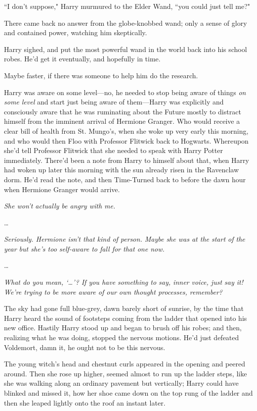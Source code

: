 ``I don't suppose," Harry murmured to the Elder Wand, ``you could just tell me?"

There came back no answer from the globe-knobbed wand; only a sense of glory and contained power, watching him skeptically.

Harry sighed, and put the most powerful wand in the world back into his school robes. He'd get it eventually, and hopefully in time.

Maybe faster, if there was someone to help him do the research.

Harry was aware on some level—no, he needed to stop being aware of things \emph{on some level} and start just being aware of them—Harry was explicitly and consciously aware that he was ruminating about the Future mostly to distract himself from the imminent arrival of Hermione Granger. Who would receive a clear bill of health from St. Mungo's, when she woke up very early this morning, and who would then Floo with Professor Flitwick back to Hogwarts. Whereupon she'd tell Professor Flitwick that she needed to speak with Harry Potter immediately. There'd been a note from Harry to himself about that, when Harry had woken up later this morning with the sun already risen in the Ravenclaw dorm. He'd read the note, and then Time-Turned back to before the dawn hour when Hermione Granger would arrive.

\emph{She won't actually be angry with me.}

{\ldots}

\emph{Seriously. Hermione isn't that kind of person. Maybe she was at the start of the year but she's too self-aware to fall for that one now.}

{\ldots}

\emph{What do you mean, `{\ldots}'? If you have something to say, inner voice, just say it! We're trying to be more aware of our own thought processes, remember?}

\later

The sky had gone full blue-grey, dawn barely short of sunrise, by the time that Harry heard the sound of footsteps coming from the ladder that opened into his new office. Hastily Harry stood up and began to brush off his robes; and then, realizing what he was doing, stopped the nervous motions. He'd just defeated Voldemort, damn it, he ought not to be this nervous.

The young witch's head and chestnut curls appeared in the opening and peered around. Then she rose up higher, seemed almost to run up the ladder steps, like she was walking along an ordinary pavement but vertically; Harry could have blinked and missed it, how her shoe came down on the top rung of the ladder and then she leaped lightly onto the roof an instant later.

